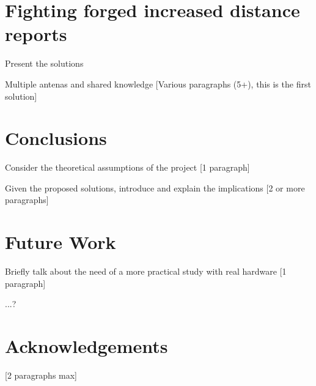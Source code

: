 \documentclass{article}
\begin{document}
\section{Fighting forged increased distance reports}

Present the solutions

Multiple antenas and shared knowledge [Various paragraphs (5+), this is the first solution]

\section{Conclusions}

Consider the theoretical assumptions of the project [1 paragraph]

Given the proposed solutions, introduce and explain the implications [2 or more paragraphs]

\section{Future Work}

Briefly talk about the need of a more practical study with real hardware [1 paragraph]

...?

\section{Acknowledgements}

[2 paragraphs max]

\printbibliography


\end{document}
